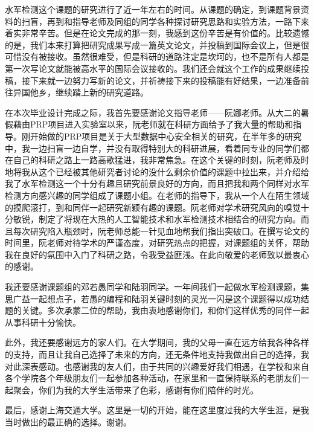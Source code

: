 \begin{thanks}

  水军检测这个课题的研究进行了近一年左右的时间。从课题的确定，到课题背景资料的扫盲，再到和指导老师及同组的同学各种探讨研究思路和实验方法，一路下来着实非常辛苦。但是在论文完成的那一刻，我感到这份辛苦是有价值的。比较遗憾的是，我们本来打算把研究成果写成一篇英文论文，并投稿到国际会议上，但是很可惜没有被接收。虽然很难受，但是科研的道路注定是坎坷的，也不是所有人都是第一次写论文就能被高水平的国际会议接收的。我们还会就这个工作的成果继续投稿，接下来就一边努力写新的论文，并祈祷接下来的投稿能有好结果，一边准备前往异国他乡，继续踏上新的研究道路。
  
  在本次毕业设计完成之际，我首先要感谢论文指导老师——阮娜老师。从大二的暑假藉由PRP项目进入实验室以来，阮老师就在科研方面给予了我大量的帮助和指导。刚开始做的PRP项目是关于大型数据中心安全相关的研究，在半年多的研究中，我一边扫盲一边自学，并没有取得特别大的科研进展，看着同专业的同学们都在自己的科研之路上一路高歌猛进，我非常焦急。在这个关键的时刻，阮老师及时地将我从这个已经被其他研究者讨论的没什么剩余价值的课题中拉出来，并介绍给我了水军检测这一个十分有趣且研究前景良好的方向，而且把我和两个同样对水军检测方向感兴趣的同学组成了课题小组。在老师的指导下，我从一个人在陌生领域的摸爬滚打，到和同伴一起研究新颖有趣的课题。阮老师对学术研究风向的嗅觉十分敏锐，制定了将现在大热的人工智能技术和水军检测技术相结合的研究方向。而且每次研究陷入瓶颈时，阮老师总能一针见血地帮我们指出突破口。在撰写论文的时间里，阮老师对待学术的严谨态度，对研究热点的把握，对课题组的关怀，帮助我在良好的氛围中入门了科研之路，令我受益匪浅。在此向敬爱的老师致以最衷心的感谢。
  
  我还要感谢课题组的邓若愚同学和陆羽同学。一年间我们一起做水军检测课题，集思广益一起想点子，若愚的编程和陆羽关键时刻的灵光一闪是这个课题得以成功结题的关键。多次承蒙二位的帮助，我由衷地感谢你们，和你们这样优秀的同伴一起从事科研十分愉快。
  
  此外，我还要感谢远方的家人们。在大学期间，我的父母一直在远方给我各种各样的支持，而且让我自己选择了未来的方向，还无条件地支持我做出自己的选择，我对此深表感动。也感谢我的友人们，由于共同的兴趣爱好我们相遇，在学校和来自各个学院各个年级朋友们一起参加各种活动，在家里和一直保持联系的老朋友们一起聚会，你们为我的大学生活带来了色彩，感谢有你们陪伴的时光。
  
  最后，感谢上海交通大学。这里是一切的开始，能在这里度过我的大学生涯，是我当时做出的最正确的选择。谢谢。

\end{thanks}

